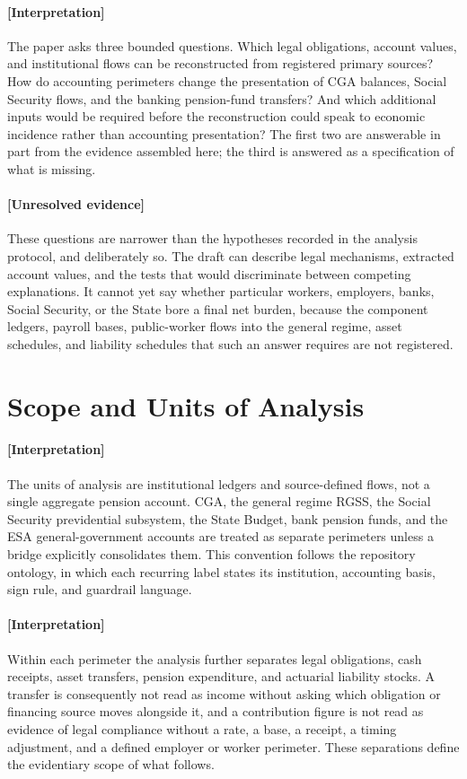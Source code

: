 \documentclass[11pt]{article}
\begin{document}
\paragraph{[Interpretation]}
The paper asks three bounded questions. Which legal obligations, account values, and institutional flows can be reconstructed from registered primary sources? How do accounting perimeters change the presentation of CGA balances, Social Security flows, and the banking pension-fund transfers? And which additional inputs would be required before the reconstruction could speak to economic incidence rather than accounting presentation? The first two are answerable in part from the evidence assembled here; the third is answered as a specification of what is missing.

\paragraph{[Unresolved evidence]}
These questions are narrower than the hypotheses recorded in the analysis protocol, and deliberately so. The draft can describe legal mechanisms, extracted account values, and the tests that would discriminate between competing explanations. It cannot yet say whether particular workers, employers, banks, Social Security, or the State bore a final net burden, because the component ledgers, payroll bases, public-worker flows into the general regime, asset schedules, and liability schedules that such an answer requires are not registered.

\section{Scope and Units of Analysis}
\label{sec:scope}
\paragraph{[Interpretation]}
The units of analysis are institutional ledgers and source-defined flows, not a single aggregate pension account. CGA, the general regime RGSS, the Social Security previdential subsystem, the State Budget, bank pension funds, and the ESA general-government accounts are treated as separate perimeters unless a bridge explicitly consolidates them. This convention follows the repository ontology, in which each recurring label states its institution, accounting basis, sign rule, and guardrail language.

\paragraph{[Interpretation]}
Within each perimeter the analysis further separates legal obligations, cash receipts, asset transfers, pension expenditure, and actuarial liability stocks. A transfer is consequently not read as income without asking which obligation or financing source moves alongside it, and a contribution figure is not read as evidence of legal compliance without a rate, a base, a receipt, a timing adjustment, and a defined employer or worker perimeter. These separations define the evidentiary scope of what follows.
\end{document}
